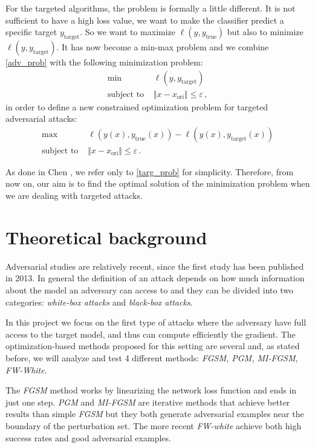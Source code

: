 \documentclass[10pt,twocolumn,letterpaper, english]{article}
\theoremstyle{definition}
\theoremstyle{plain}
\theoremstyle{plain}
\theoremstyle{plain}
\theoremstyle{plain}
\theoremstyle{remark}
\theoremstyle{remark}
\theoremstyle{definition}
\theoremstyle{definition}
\theoremstyle{definition}
\theoremstyle{definition}
\renewcommand{\epsilon}{\varepsilon}
\begin{document}
For the targeted algorithms, the problem is formally a little different. 
It is not sufficient to have a high loss value, we want to make the classifier predict a specific target $y_{\text{target}}$. 
So we want to maximize $\ell(y, y_{\text{true}})$ but also to minimize $\ell(y, y_{\text{target}})$. 
It has now become a min-max problem and we combine \ref{adv_prob} with the following minimization problem:
\begin{align}
    \min \,\, &\ell(y, y_{\text{target}}) \label{targ_prob} \\ 
    \text{subject to } & \Vert x - x_{\text{ori}} \Vert \le \epsilon \nonumber \,,
\end{align}
in order to define a new constrained optimization problem for targeted adversarial attacks: 
\begin{align*}
    \max \,\, & \ell(y(x), y_{\text{true}}(x)) - \ell(y(x), y_{\text{target}}(x)) \\
    \text{subject to } & \Vert x - x_{\text{ori}} \Vert \le \epsilon \,.
\end{align*}

As done in Chen \cite{frank}, we refer only to \ref{targ_prob} for simplicity.
Therefore, from now on, our aim is to find the optimal solution of the minimization problem when we are dealing with targeted attacks. 



\section{Theoretical background}
Adversarial studies are relatively recent, since the first study has been published in 2013. In general the definition of an attack depends on how much information about the model an adversary can access to and they can be divided into two categories: \textit{white-box attacks} and \textit{black-box attacks}.

In this project we focus on the first type of attacks where the adversary have full access to the target model, and thus can compute efficiently the gradient. The optimization-based methods proposed for this setting are several and, as stated before, we will analyze and test 4 different methods: \textit{FGSM, PGM, MI-FGSM, FW-White}.

The \textit{FGSM} method works by linearizing the network loss function and ends in just one step. \textit{PGM} and \textit{MI-FGSM} are iterative methods that achieve better results than simple \textit{FGSM} but they both generate adversarial examples near the boundary of the perturbation set. The more recent \textit{FW-white} achieve both high success rates and good adversarial examples.
\end{document}
